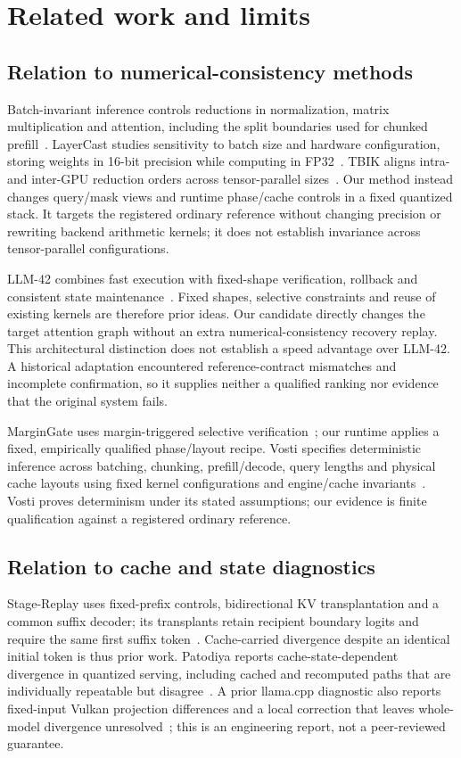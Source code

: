 \section{Related work and limits}
\label{sec:limits}
\subsection{Relation to numerical-consistency methods}
Batch-invariant inference controls reductions in normalization, matrix multiplication and attention, including the split boundaries used for chunked prefill~\cite{thinkingmachines}. LayerCast studies sensitivity to batch size and hardware configuration, storing weights in 16-bit precision while computing in FP32~\cite{layercast}. TBIK aligns intra- and inter-GPU reduction orders across tensor-parallel sizes~\cite{tbik}. Our method instead changes query/mask views and runtime phase/cache controls in a fixed quantized stack. It targets the registered ordinary reference without changing precision or rewriting backend arithmetic kernels; it does not establish invariance across tensor-parallel configurations.

LLM-42 combines fast execution with fixed-shape verification, rollback and consistent state maintenance~\cite{llm42}. Fixed shapes, selective constraints and reuse of existing kernels are therefore prior ideas. Our candidate directly changes the target attention graph without an extra numerical-consistency recovery replay. This architectural distinction does not establish a speed advantage over LLM-42. A historical adaptation encountered reference-contract mismatches and incomplete confirmation, so it supplies neither a qualified ranking nor evidence that the original system fails.

MarginGate uses margin-triggered selective verification~\cite{margingate}; our runtime applies a fixed, empirically qualified phase/layout recipe. Vosti specifies deterministic inference across batching, chunking, prefill/decode, query lengths and physical cache layouts using fixed kernel configurations and engine/cache invariants~\cite{vosti}. Vosti proves determinism under its stated assumptions; our evidence is finite qualification against a registered ordinary reference.

\subsection{Relation to cache and state diagnostics}
Stage-Replay uses fixed-prefix controls, bidirectional KV transplantation and a common suffix decoder; its transplants retain recipient boundary logits and require the same first suffix token~\cite{stagereplay}. Cache-carried divergence despite an identical initial token is thus prior work. Patodiya reports cache-state-dependent divergence in quantized serving, including cached and recomputed paths that are individually repeatable but disagree~\cite{cachestate}. A prior llama.cpp diagnostic also reports fixed-input Vulkan projection differences and a local correction that leaves whole-model divergence unresolved~\cite{vulkandiagnostic}; this is an engineering report, not a peer-reviewed guarantee.

